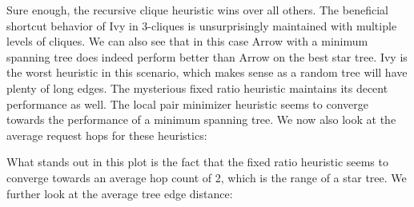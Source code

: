 \documentclass[a4paper, oneside]{discothesis}
\begin{document}
Sure enough, the recursive clique heuristic wins over all others. The beneficial shortcut behavior of Ivy in 3-cliques is unsurprisingly maintained with multiple levels of cliques. We can also see that in this case Arrow with a minimum spanning tree does indeed perform better than Arrow on the best star tree. Ivy is the worst heuristic in this scenario, which makes sense as a random tree will have plenty of long edges. The mysterious fixed ratio heuristic maintains its decent performance as well. The local pair minimizer heuristic seems to converge towards the performance of a minimum spanning tree. We now also look at the average request hops for these heuristics:


What stands out in this plot is the fact that the fixed ratio heuristic seems to converge towards an average hop count of 2, which is the range of a star tree. We further look at the average tree edge distance:

\end{document}
